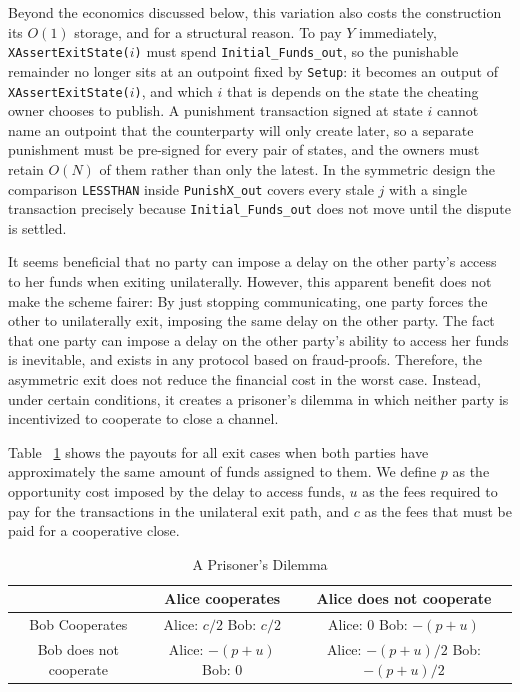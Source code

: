 \documentclass[11pt,a4paper]{article}
\newcommand{\txname}[1]{\texttt{#1}}
\newcommand{\ioname}[1]{\texttt{#1}}
\newcommand{\opc}[1]{\texttt{#1}} %
\begin{document}
Beyond the economics discussed below, this variation also costs the construction its $O(1)$ storage, and for a structural reason. To pay $Y$ immediately, \txname{XAssertExitState($i$)} must spend \ioname{Initial\_Funds\_out}, so the punishable remainder no longer sits at an outpoint fixed by \txname{Setup}: it becomes an output of \txname{XAssertExitState($i$)}, and which $i$ that is depends on the state the cheating owner chooses to publish. A punishment transaction signed at state $i$ cannot name an outpoint that the counterparty will only create later, so a separate punishment must be pre-signed for every pair of states, and the owners must retain $O(N)$ of them rather than only the latest. In the symmetric design the comparison \opc{LESSTHAN} inside \ioname{PunishX\_out} covers every stale $j$ with a single transaction precisely because \ioname{Initial\_Funds\_out} does not move until the dispute is settled.

It seems beneficial that no party can impose a delay on the other party's access to her funds when exiting unilaterally. However, this apparent benefit does not make the scheme fairer: By just stopping communicating, one party forces the other to unilaterally exit, imposing the same delay on the other party. The fact that one party can impose a delay on the other party's ability to access her funds is inevitable, and exists in any protocol based on fraud-proofs. Therefore, the asymmetric exit does not reduce the financial cost in the worst case. Instead, under certain conditions, it creates a prisoner's dilemma in which neither party is incentivized to cooperate to close a channel. 

Table ~\ref{tab:dilemma} shows the payouts for all exit cases when both parties have approximately the same amount of funds assigned to them. We define $p$ as the opportunity cost imposed by the delay to access funds, $u$ as the fees required to pay for the transactions in the unilateral exit path, and $c$ as the fees that must be paid for a cooperative close. 


\begin{table}
    \centering
    \begin{tabular}{|c|c|c|}
    \hline
         & Alice cooperates &  Alice does not cooperate\\
         \hline
       Bob Cooperates  & 
       \shortstack{Alice: $c/2$ \\ Bob: $c/2$} & \shortstack{Alice:  0 \\ Bob: $-(p+u)$} \\
       \hline
       Bob does not cooperate  & 
       \shortstack{Alice: $-(p+u)$ \\ Bob: 0} & 
       \shortstack{Alice: $-(p+u)/2$ \\ Bob: $-(p+u)/2$}  \\
       \hline
    \end{tabular}
    \caption{A Prisoner's Dilemma}
    \label{tab:dilemma}
\end{table}
\end{document}
